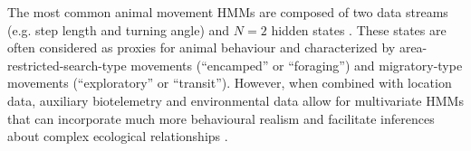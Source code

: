 \documentclass[12pt]{article}\usepackage[]{graphicx}\usepackage[]{color}
\begin{document}
%
The most common animal movement HMMs are composed of two data streams (e.g. step length and turning angle) and $N=2$ hidden states \citep{MoralesEtAl2004,JonsenEtAl2005}. These states are often considered as proxies for animal behaviour and characterized by area-restricted-search-type movements  (``encamped'' or ``foraging'') and migratory-type movements (``exploratory'' or ``transit''). However, when combined with location data, auxiliary biotelemetry and environmental data allow for multivariate HMMs that can incorporate much more behavioural realism and facilitate inferences about complex ecological relationships  %
\citep[e.g.][]{McClintockEtAl2013c,McClintockEtAl2017,DeRuiterEtAl2017}.  
%
\end{document}
